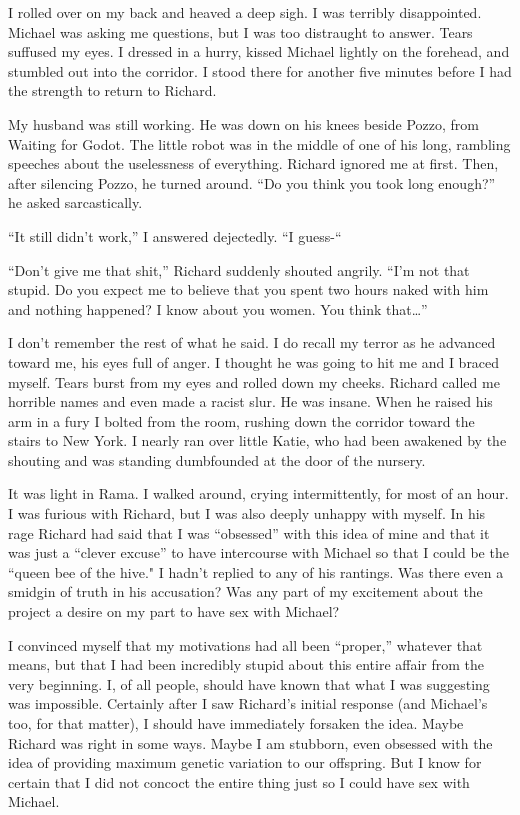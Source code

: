 \documentclass[]{article}
\begin{document}
I rolled over on my back and heaved a deep sigh.  I was terribly disappointed.  Michael was asking me questions, but I was too distraught to answer.  Tears suffused my eyes.  I dressed in a hurry, kissed Michael lightly on the forehead, and stumbled out into the corridor.  I stood there for another five minutes before I had the strength to return to Richard.

My husband was still working.  He was down on his knees beside Pozzo, from Waiting for Godot.  The little robot was in the middle of one of his long, rambling speeches about the uselessness of everything.  Richard ignored me at first.  Then, after silencing Pozzo, he turned around.  “Do you think you took long enough?” he asked sarcastically.

“It still didn’t work,” I answered dejectedly.  “I guess-“

“Don’t give me that shit,” Richard suddenly shouted angrily.  “I’m not that stupid.  Do you expect me to believe that you spent two hours naked with him and nothing happened? I know about you women.  You think that…”

I don’t remember the rest of what he said.  I do recall my terror as he advanced toward me, his eyes full of anger.  I thought he was going to hit me and I braced myself.  Tears burst from my eyes and rolled down my cheeks.  Richard called me horrible names and even made a racist slur.  He was insane.  When he raised his arm in a fury I bolted from the room, rushing down the corridor toward the stairs to New York.  I nearly ran over little Katie, who had been awakened by the shouting and was standing dumbfounded at the door of the nursery.

It was light in Rama.  I walked around, crying intermittently, for most of an hour.  I was furious with Richard, but I was also deeply unhappy with myself.  In his rage Richard had said that I was “obsessed” with this idea of mine and that it was just a “clever excuse” to have intercourse with Michael so that I could be the “queen bee of the hive."  I hadn’t replied to any of his rantings.  Was there even a smidgin of truth in his accusation? Was any part of my excitement about the project a desire on my part to have sex with Michael?

I convinced myself that my motivations had all been “proper,” whatever that means, but that I had been incredibly stupid about this entire affair from the very beginning.  I, of all people, should have known that what I was suggesting was impossible.  Certainly after I saw Richard’s initial response (and Michael’s too, for that matter), I should have immediately forsaken the idea.  Maybe Richard was right in some ways.  Maybe I am stubborn, even obsessed with the idea of providing maximum genetic variation to our offspring.  But I know for certain that I did not concoct the entire thing just so I could have sex with Michael.
\end{document}
